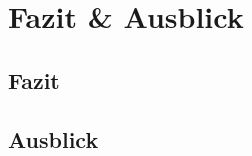 \section{Fazit \& Ausblick} %
\label{sec:fazit_ausblick}

\subsection{Fazit} %
\label{sub:fazit}


\subsection{Ausblick} %
\label{sub:ausblick}


